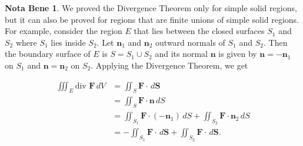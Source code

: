 \documentclass[11pt,oneside,english]{amsart}
\theoremstyle{definition}
\newtheorem*{note}{Nota Bene}
\begin{document}
\begin{note}
We proved the Divergence Theorem only for simple solid regions, but it can also be proved for regions that are finite unions of simple solid regions. For example, consider the region $E$ that lies between the closed surfaces $S_1$ and $S_2$ where $S_1$ lies inside $S_2$. Let $\mathbf{n}_1$ and $\mathbf{n}_2$ outward normals of $S_1$ and $S_2$. Then the boundary surface of $E$ is $S=S_1\cup S_2$ and its normal $\mathbf{n}$ is given by $\mathbf{n}=-\mathbf{n}_1$ on $S_1$ and $\mathbf{n}=\mathbf{n}_2$ on $S_2$. Applying the Divergence Theorem, we get

\begin{align*}
\iiint_E\text{div }\mathbf{F}\,dV&=\iint_S\mathbf{F}\cdot\,d\mathbf{S}\\[2mm]
&=\iint_S\mathbf{F}\cdot\mathbf{n}\,dS\\[2mm]
&=\iint_{S_1}\mathbf{F}\cdot(-\mathbf{n}_1)\,dS+\iint_{S_2}\mathbf{F}\cdot\mathbf{n}_2\,dS\\[2mm]
&=-\iint_{S_1}\mathbf{F}\cdot\,d\mathbf{S}+\iint_{S_2}\mathbf{F}\cdot\,d\mathbf{S}.
\end{align*}
\end{note}

\pagebreak
\end{document}

